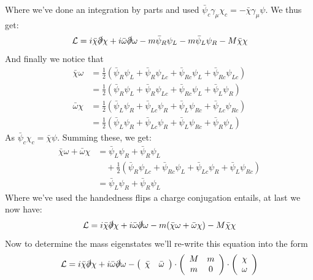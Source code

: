 \documentclass[11pt,a4paper,faculty=we,language=en,doctype=report]{cls/ugent-doc}
\begin{document}
Where we've done an integration by parts and used $\bar{\psi}_c\gamma_\mu\chi_c = -\bar{\chi}\gamma_\mu\psi$. We thus get:
\begin{equation}
	\mathcal{L} = i\bar{\chi}\slashed{\partial}\chi +i\bar{\omega}\slashed{\partial}\omega - m\bar{\psi}_R\psi_{L} - m\bar{\psi}_L\psi_{R} -M\bar{\chi} \chi 
\end{equation}
And finally we notice that
\begin{align}
	\bar{\chi}\omega &= \frac{1}{2} \left(\bar{\psi}_R\psi_L + \bar{\psi}_R\psi_{Lc} + \bar{\psi}_{Rc}\psi_{L} + \bar{\psi}_{Rc}\psi_{Lc}\right)\\
	&=  \frac{1}{2} \left(\bar{\psi}_R\psi_L + \bar{\psi}_R\psi_{Lc} + \bar{\psi}_{Rc}\psi_{L} + \bar{\psi}_{L}\psi_{R}\right)\\
	\bar{\omega}\chi &= \frac{1}{2} \left(\bar{\psi}_L \psi_{R} + \bar{\psi}_{Lc}\psi_{R} + \bar{\psi}_L\psi_{Rc} + \bar{\psi}_{Lc}\psi_{Rc}\right)\\
	&= \frac{1}{2} \left(\bar{\psi}_L \psi_{R} + \bar{\psi}_{Lc}\psi_{R} + \bar{\psi}_L\psi_{Rc} + \bar{\psi}_{R}\psi_{L}\right)
\end{align}
As $\bar{\psi}_c\chi_c = \bar{\chi}\psi$. Summing these, we get:
\begin{align}
	\bar{\chi}\omega + \bar{\omega}\chi &= \bar{\psi}_L \psi_R + \bar{\psi}_R \psi_{L}\\
	&\quad + \frac{1}{2}\left(\bar{\psi}_R\psi_{Lc} + \bar{\psi}_{Rc} \psi_{L} + \bar{\psi}_{Lc}\psi_R + \bar{\psi}_L\psi_{Rc}\right)\\
	&= \bar{\psi}_L \psi_R + \bar{\psi}_R \psi_{L}
\end{align}
Where we've used the handedness flips a charge conjugation entails, at last we now have:
\begin{equation}
	\mathcal{L} = i\bar{\chi}\slashed{\partial}\chi +i\bar{\omega}\slashed{\partial}\omega - m(\bar{\chi}\omega + \bar{\omega}\chi) -M\bar{\chi} \chi 
\end{equation}
Now to determine the mass eigenstates we'll re-write this equation into the form
\begin{equation}
	\mathcal{L} = i\bar{\chi}\slashed{\partial}\chi +i\bar{\omega}\slashed{\partial}\omega 
	-\left(\begin{array}{cc}
		\bar{\chi} &\bar{\omega}
	\end{array}\right)\cdot
	\left(\begin{array}{cc}
		M & m \\
		m & 0
	\end{array}\right) \cdot \left(\begin{array}{c}
	\chi \\ \omega
\end{array}\right)
\end{equation}
\end{document}
